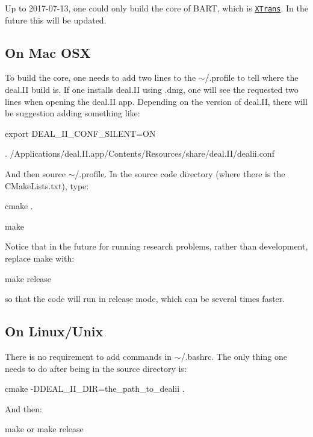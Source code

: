 Up to 2017-\/07-\/13, one could only build the core of B\+A\+RT, which is \href{https://github.com/weixiong-zheng-berkeley/XTrans}{\tt X\+Trans}. In the future this will be updated. \subsection*{On Mac O\+SX}

To build the core, one needs to add two lines to the $\sim$/.profile to tell where the deal.\+II build is. If one installs deal.\+II using .dmg, one will see the requested two lines when opening the deal.\+II app. Depending on the version of deal.\+II, there will be suggestion adding something like\+:

{\ttfamily export D\+E\+A\+L\+\_\+\+I\+I\+\_\+\+C\+O\+N\+F\+\_\+\+S\+I\+L\+E\+NT=ON}

{\ttfamily . /\+Applications/deal.I\+I.\+app/\+Contents/\+Resources/share/deal.I\+I/dealii.\+conf}

And then source $\sim$/.profile. In the source code directory (where there is the C\+Make\+Lists.\+txt), type\+:

{\ttfamily cmake .}

{\ttfamily make}

Notice that in the future for running research problems, rather than development, replace {\ttfamily make} with\+:

{\ttfamily make release}

so that the code will run in release mode, which can be several times faster.

\subsection*{On Linux/\+Unix}

There is no requirement to add commands in $\sim$/.bashrc. The only thing one needs to do after being in the source directory is\+:

{\ttfamily cmake -\/\+D\+D\+E\+A\+L\+\_\+\+I\+I\+\_\+\+D\+IR=the\+\_\+path\+\_\+to\+\_\+dealii .}

And then\+:

{\ttfamily make} or {\ttfamily make release} 